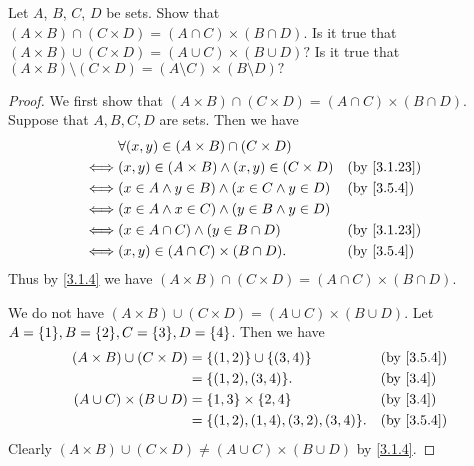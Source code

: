 \begin{ex}\label{ex:3.5.5}
	Let \(A\), \(B\), \(C\), \(D\) be sets.
	Show that \((A \times B) \cap (C \times D) = (A \cap C) \times (B \cap D)\).
	Is it true that \((A \times B) \cup (C \times D) = (A \cup C) \times (B \cup D)?\)
	Is it true that \((A \times B) \setminus (C \times D) = (A \setminus C) \times (B \setminus D)?\)
\end{ex}

\begin{proof}
	We first show that \((A \times B) \cap (C \times D) = (A \cap C) \times (B \cap D)\).
	Suppose that \(A, B, C, D\) are sets.
	Then we have
	\begin{align*}
		     & \forall (x, y) \in (A \times B) \cap (C \times D)                      \\
		\iff & (x, y) \in (A \times B) \land (x, y) \in (C \times D) &  & \by{3.1.23} \\
		\iff & (x \in A \land y \in B) \land (x \in C \land y \in D) &  & \by{3.5.4}  \\
		\iff & (x \in A \land x \in C) \land (y \in B \land y \in D)                  \\
		\iff & (x \in A \cap C) \land (y \in B \cap D)               &  & \by{3.1.23} \\
		\iff & (x, y) \in (A \cap C) \times (B \cap D).              &  & \by{3.5.4}
	\end{align*}
	Thus by \cref{3.1.4} we have \((A \times B) \cap (C \times D) = (A \cap C) \times (B \cap D)\).

	We do not have \((A \times B) \cup (C \times D) = (A \cup C) \times (B \cup D)\).
	Let \(A = \set{1}, B = \set{2}, C = \set{3}, D = \set{4}\).
	Then we have
	\begin{align*}
		(A \times B) \cup (C \times D) & = \set{(1, 2)} \cup \set{(3, 4)}        &  & \by{3.5.4} \\
		                               & = \set{(1, 2), (3, 4)}.                 &  & \by{3.4}   \\
		(A \cup C) \times (B \cup D)   & = \set{1, 3} \times \set{2, 4}          &  & \by{3.4}   \\
		                               & = \set{(1, 2), (1, 4), (3, 2), (3, 4)}. &  & \by{3.5.4}
	\end{align*}
	Clearly \((A \times B) \cup (C \times D) \neq (A \cup C) \times (B \cup D)\) by \cref{3.1.4}.


\end{proof}
